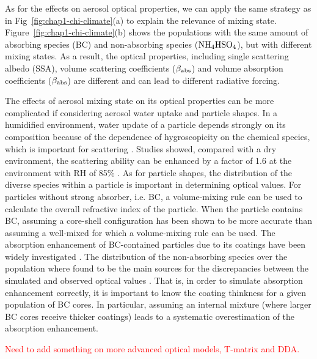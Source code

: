 \documentclass[edeposit,fullpage]{uiucthesis2009}
\begin{document}
As for the effects on aerosol optical properties, we can apply the
same strategy as in Fig~\ref{fig:chap1-chi-climate}(a) to explain the
relevance of mixing state. Figure~\ref{fig:chap1-chi-climate}(b) shows
the populations with the same amount of absorbing species (BC) and
non-absorbing species ($\rm NH_4HSO_4$), but with different mixing
states. As a result, the optical properties, including single
scattering albedo (SSA), volume scattering coefficients ($\beta_{\rm
  abs}$) and volume absorption coefficients ($\beta_{\rm abs}$) are
different and can lead to different radiative forcing.

The effects of aerosol mixing state on its optical properties can be
more complicated if considering aerosol water uptake and particle
shapes. In a humidified environment, water update of a particle
depends strongly on its composition because of the dependence of
hygroscopicity on the chemical species, which is important for
scattering \citep{MichelFlores2012, Zieger2013, Titos2014,
  Titos2016}. Studies showed, compared with a dry environment, the
scattering ability can be enhanced by a factor of 1.6 at the
environment with RH of 85\% \citep{Burgos2020}. As for particle
shapes, the distribution of the diverse species {\rm within} a
particle is important in determining optical values. For particles
without strong absorber, i.e. BC, a volume-mixing rule can be used to
calculate the overall refractive index of the particle. When the
particle contains BC, assuming a core-shell configuration has been
shown to be more accurate \citep{Bond2006} than assuming a well-mixed
for which a volume-mixing rule can be used. The absorption enhancement
of BC-contained particles due to its coatings have been widely
investigated \citep{Moffet2009,Liu2017, wu2020light}. The distribution
of the non-absorbing species over the population where found to be the
main sources for the discrepancies between the simulated and observed
optical values \citep{Fierce2016, Fierce2020}. That is, in order to
simulate absorption enhancement correctly, it is important to know the
coating thinkness for a given population of BC cores. In particular,
assuming an internal mixture (where larger BC cores receive thicker
coatings) leads to a systematic overestimation of the absorption
enhancement.

\textcolor{red}{Need to add something on more advanced optical models,
  T-matrix and DDA.}
\end{document}
